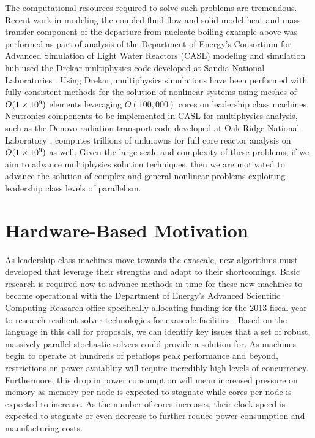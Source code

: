The computational resources required to solve such problems are
tremendous. Recent work in modeling the coupled fluid flow and solid
model heat and mass transfer component of the departure from nucleate
boiling example above was performed as part of analysis of the
Department of Energy's Consortium for Advanced Simulation of Light
Water Reactors (CASL) modeling and simulation hub used the Drekar
multiphysics code developed at Sandia National Laboratories
\citep{pawlowski_drekar_2012}. Using Drekar, multiphysics simulations
have been performed with fully consistent methods for the solution of
nonlinear systems using meshes of $O(1\times 10^{9})$ elements leveraging
$O(100,000)$ cores on leadership class machines. Neutronics components
to be implemented in CASL for multiphysics analysis, such as the
Denovo radiation transport code developed at Oak Ridge National
Laboratory \citep{evans_denovo:_2010}, computes trillions of unknowns
for full core reactor analysis on $O(1\times 10^{9})$ as well. Given the
large scale and complexity of these problems, if we aim to advance
multiphysics solution techniques, then we are motivated to advance the
solution of complex and general nonlinear problems exploiting
leadership class levels of parallelism.

\section{Hardware-Based Motivation}
\label{sec:hardware_motivation}
As leadership class machines move towards the exascale, new algorithms
must developed that leverage their strengths and adapt to their
shortcomings. Basic research is required now to advance methods in
time for these new machines to become operational with the Department
of Energy's Advanced Scientific Computing Reasarch office specifically
allocating funding for the 2013 fiscal year to research resilient
solver technologies for exascale facilities
\citep{u.s._department_of_energy_resilient_2012}. Based on the
language in this call for proposals, we can identify key issues that a
set of robust, massively parallel stochastic solvers could provide a
solution for. As machines begin to operate at hundreds of petaflops
peak performance and beyond, restrictions on power avaiablity will
require incredibly high levels of concurrency. Furthermore, this drop
in power consumption will mean increased pressure on memory as memory
per node is expected to stagnate while cores per node is expected to
increase. As the number of cores increases, their clock speed is
expected to stagnate or even decrease to further reduce power
consumption and manufacturing costs.

